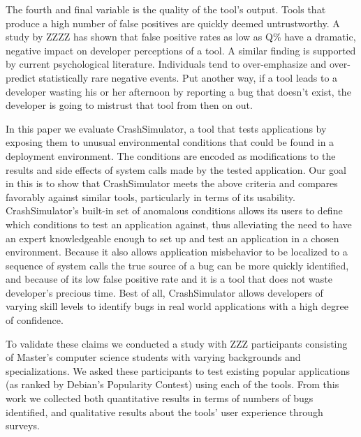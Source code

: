 The fourth and final variable is the quality of the tool's output.  Tools
that produce a high number of false positives are quickly deemed
untrustworthy.  A study by ZZZZ has shown that false positive rates as low
as Q\% have a dramatic, negative impact on developer perceptions of a tool.
  A similar finding is supported by current psychological
literature.  Individuals tend to over-emphasize and over-predict
statistically rare negative events.  Put another way, if a
tool leads to a developer wasting his or her afternoon by reporting a bug
that doesn't exist, the developer is going to mistrust that tool from then
on out.


In this paper we evaluate CrashSimulator, a tool that tests applications by
exposing them to unusual environmental conditions
that could be found in a deployment environment.  The conditions are
encoded as modifications to the results and side effects of system calls
made by the tested application.
Our goal in this is to show that CrashSimulator meets the above
criteria and compares favorably against similar tools, particularly in
terms of its usability.  CrashSimulator's
built-in set of anomalous conditions allows its users to define which
conditions to test an application against, thus alleviating the need to
have an expert knowledgeable enough to set up and test an application in a
chosen environment.  Because it also allows
application misbehavior to be localized
to a sequence of system calls the true source of a bug can be more
quickly identified,
and because of its low false positive rate and it
is a tool that does not waste developer's precious time.
Best of all, CrashSimulator allows developers of varying skill levels to
identify bugs in real world applications with a high degree of confidence.

To validate these claims we conducted a study with ZZZ participants
consisting of Master's computer science students with varying backgrounds
and specializations.  We asked these participants to test existing popular
applications (as ranked by Debian's Popularity Contest) using each of the
tools.  From this work we collected both quantitative results in terms of
numbers of bugs identified, and qualitative results about the tools' user
experience through surveys.

